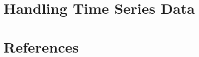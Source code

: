 \documentclass[
  letterpaper,
  DIV=11,
  numbers=noendperiod]{scrreprt}
\newlength{\cslhangindent}
\newlength{\cslentryspacingunit} %
\newenvironment{CSLReferences}[2] %
 {%
  \setlength{\parindent}{0pt}
  \ifodd #1
  \let\oldpar\par
  \def\par{\hangindent=\cslhangindent\oldpar}
  \fi
  \setlength{\parskip}{#2\cslentryspacingunit}
 }%
 {}
\begin{document}
\hypertarget{handling-time-series-data}{%
\chapter{Handling Time Series Data}\label{handling-time-series-data}}


\hypertarget{references}{%
\chapter*{References}\label{references}}


\hypertarget{refs}{}
\begin{CSLReferences}{0}{0}
\end{CSLReferences}
\end{document}
